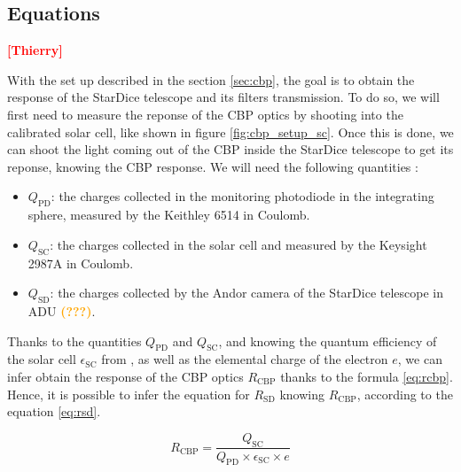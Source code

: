 \documentclass[onecolumn]{aa}
\newcommand{\QSD}{Q_{\mathrm{SD}}}
\newcommand{\QPD}{Q_{\mathrm{PD}}}
\newcommand{\QSC}{Q_{\mathrm{SC}}}
\newcommand{\RCBP}{R_{\mathrm{CBP}}}
\newcommand{\RSD}{R_{\mathrm{SD}}}
\newcommand{\todo}[1]{\textbf{\textcolor{red}{[#1]}}\xspace}
\newcommand{\com}[1]{\textbf{\textcolor{orange}{(#1)}}\xspace}
\begin{document}

\subsection{Equations}

\todo{Thierry}


With the set up described in the section \ref{sec:cbp}, the goal is to obtain the response of the StarDice telescope and its filters transmission. To do so, we will first need to measure the reponse of the CBP optics by shooting into the calibrated solar cell, like shown in figure \ref{fig:cbp_setup_sc}. Once this is done, we can shoot the light coming out of the CBP inside the StarDice telescope to get its reponse, knowing the CBP response. We will need the following quantities : 

\begin{itemize}
    \item $\QPD$: the charges collected in the monitoring photodiode in the integrating sphere, measured by the Keithley 6514 in Coulomb.
    \item $\QSC$: the charges collected in the solar cell and measured by the Keysight 2987A in Coulomb.
    \item $\QSD$: the charges collected by the Andor camera of the StarDice telescope in ADU \com{???}.
\end{itemize}

\noindent Thanks to the quantities $\QPD$ and $\QSC$, and knowing the quantum efficiency of the solar cell $\epsilon_{\mathrm{SC}}$ from \cite{solarcell}, as well as the elemental charge of the electron $e$, we can infer obtain the response of the CBP optics $\RCBP$ thanks to the formula \ref{eq:rcbp}.  Hence, it is possible to infer the equation for $\RSD$ knowing $\RCBP$, according to the equation \ref{eq:rsd}. 

\begin{equation}
    \RCBP = \frac{\QSC}{\QPD \times \epsilon_{\mathrm{SC}} \times e}
    \label{eq:rcbp}
\end{equation} 
\end{document}
